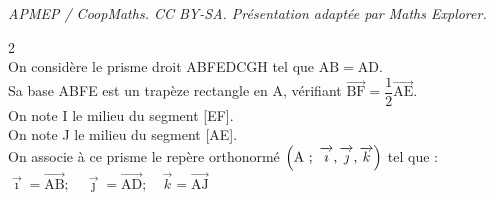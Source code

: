 \documentclass[10pt]{article}
\providecommand{\vect}[1]{\overrightarrow{#1}}
\begin{document}
\noindent\textit{APMEP / CoopMaths. CC BY-SA. Présentation adaptée par Maths Explorer.}\par\medskip
\begin{multicols}{2}
~\\
On considère le prisme droit ABFEDCGH tel que $\mathrm{AB} = \mathrm{AD}$.\\

Sa base ABFE est un trapèze rectangle en A, vérifiant $\vect{\mathrm{BF}} = \dfrac{1}{2} \vect{\mathrm{AE}}$.\\

On note I le milieu du segment [EF].\\

On note J le milieu du segment [AE].\\

On associe à ce prisme le repère orthonormé $\left(\text{A}~;~ \vect{\imath\vphantom{k}}, \vect{\jmath\vphantom{k}}, \vect{k}\right)$ tel que :\\
$\vect{\imath} = \vect{\mathrm{AB}} ;\quad \vect{\jmath} = \vect{\mathrm{AD}} ;\quad \vect{k} = \vect{\mathrm{AJ}}$

\vfill\null

\columnbreak

\end{multicols}
\end{document}
